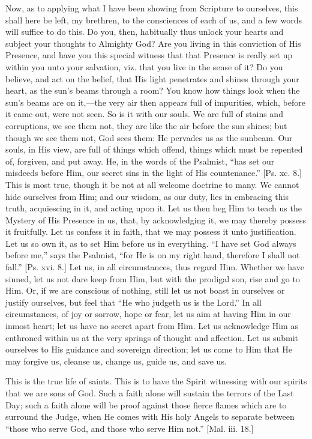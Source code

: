 Now, as to applying what I have been showing from Scripture to
ourselves, this shall here be left, my brethren, to the consciences of
each of us, and a few words will suffice to do this. Do you, then,
habitually thus unlock your hearts and subject your thoughts to
Almighty God? Are you living in this conviction of His Presence, and
have you this special witness that that Presence is really set up
within you unto your salvation, viz. that you live in the sense of it?
Do you believe, and act on the belief, that His light penetrates and
shines through your heart, as the sun's beams through a room? You know
how things look when the sun's beams are on it,—the very air then
appears full of impurities, which, before it came out, were not seen.
So is it with our souls. We are full of stains and corruptions, we see
them not, they are like the air before the sun shines; but though we
see them not, God sees them: He pervades us as the sunbeam. Our souls,
in His view, are full of things which offend, things which must be
repented of, forgiven, and put away. He, in the words of the Psalmist,
``has set our misdeeds before Him, our secret sins in the light of
His countenance.'' [Ps. xc. 8.] This is most true, though it be
not at all welcome doctrine to many. We cannot hide ourselves from
Him; and our wisdom, as our duty, lies in embracing this truth,
acquiescing in it, and acting upon it. Let us then beg Him to teach us
the Mystery of His Presence in us, that, by acknowledging it, we may
thereby possess it fruitfully. Let us confess it in faith, that we may
possess it unto justification. Let us so own it, as to set Him before
us in everything. ``I have set God always before me,''
says the Psalmist, ``for He is on my right hand, therefore I shall
not fall.'' [Ps. xvi. 8.] Let us, in all circumstances, thus
regard Him. Whether we have sinned, let us not dare keep from Him, but
with the prodigal son, rise and go to Him. Or, if we are conscious of
nothing, still let us not boast in ourselves or justify ourselves, but
feel that ``He who judgeth us is the Lord.'' In all
circumstances, of joy or sorrow, hope or fear, let us aim at having
Him in our inmost heart; let us have no secret apart from Him. Let us
acknowledge Him as enthroned within us at the very springs of thought
and affection. Let us submit ourselves to His guidance and sovereign
direction; let us come to Him that He may forgive us, cleanse us,
change us, guide us, and save us.

This is the true life of saints. This is to have the Spirit
witnessing with our spirits that we are sons of God. Such a faith
alone will sustain the terrors of the Last Day; such a faith alone
will be proof against those fierce flames which are to surround the
Judge, when He comes with His holy Angels to separate between
``those who serve God, and those who serve Him not.'' [Mal.
iii. 18.]

